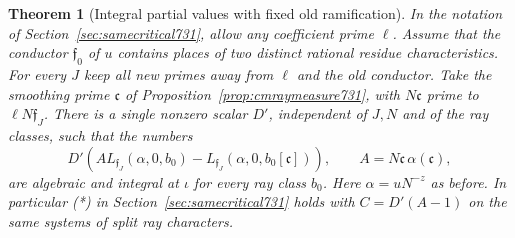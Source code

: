 \documentclass[a4paper,11pt]{article}
\newtheorem{theorem}[proposition]{Theorem}
\theoremstyle{definition}
\theoremstyle{remark}
\numberwithin{equation}{section}
\begin{document}
\begin{theorem}[Integral partial values with fixed old ramification]
\leavevmode\label{thm:badcmmeasure733}
In the notation of Section~\ref{sec:samecritical731}, allow any
coefficient prime \(\ell\). Assume that the conductor
\(\mathfrak f_0\) of \(u\) contains places of two distinct rational
residue characteristics. For every \(J\) keep all new primes away
from \(\ell\) and the old conductor. Take the smoothing prime
\(\mathfrak c\) of Proposition~\ref{prop:cmraymeasure731}, with
\(N\mathfrak c\) prime to \(\ell N\mathfrak f_J\). There is a
single nonzero scalar \(D'\), independent of \(J,N\) and of the
ray classes, such that the numbers
\[
 D'\left(A L_{\mathfrak f_J}(\alpha,0,b_0)
                 -L_{\mathfrak f_J}(\alpha,0,b_0[\mathfrak c])\right),
       \qquad A=N\mathfrak c\,\alpha(\mathfrak c),
\]
are algebraic and integral at \(\iota\) for every ray class \(b_0\).
Here \(\alpha=uN^{-z}\) as before. In particular (*) in
Section~\ref{sec:samecritical731} holds with
\(C=D'(A-1)\) on the same systems of split ray characters.
\end{theorem}
\end{document}
